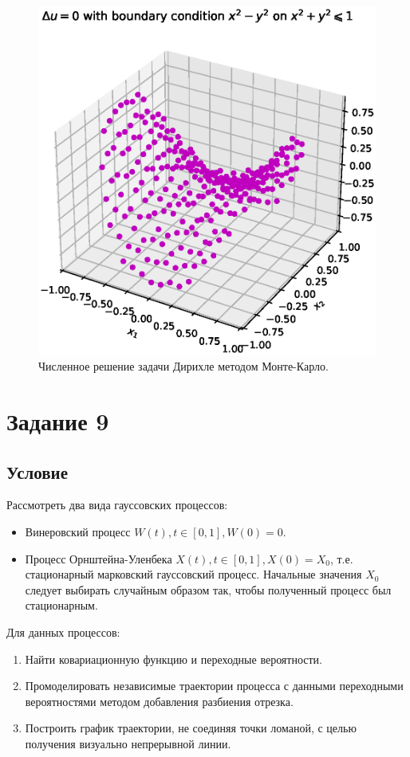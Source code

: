 \documentclass[11pt]{report}
\begin{document}
\begin{figure}[H]
    \centering
    \includegraphics[width=0.9\linewidth]{images/laplace-solution.eps}
    \caption{Численное решение задачи Дирихле методом Монте-Карло.}
    \label{fig:laplace-solution}
\end{figure}

\newpage

\section{Задание 9}

\subsection{Условие}

Рассмотреть два вида гауссовских процессов:
\begin{itemize}
\item Винеровский процесс $W(t), t\in[0,1], W(0)=0$.
\item Процесс Орнштейна-Уленбека $X(t), t\in[0,1], X(0)=X_0$, т.е. стационарный марковский гауссовский процесс. Начальные значения $X_0$ следует выбирать случайным образом так, чтобы полученный процесс был стационарным.
\end{itemize}

Для данных процессов:
\begin{enumerate}
\item Найти ковариационную функцию и переходные вероятности.
\item Промоделировать независимые траектории процесса с данными переходными вероятностями методом добавления разбиения отрезка.
\item Построить график траектории, не соединяя точки ломаной, с целью получения визуально непрерывной линии.
\end{enumerate}
\end{document}

